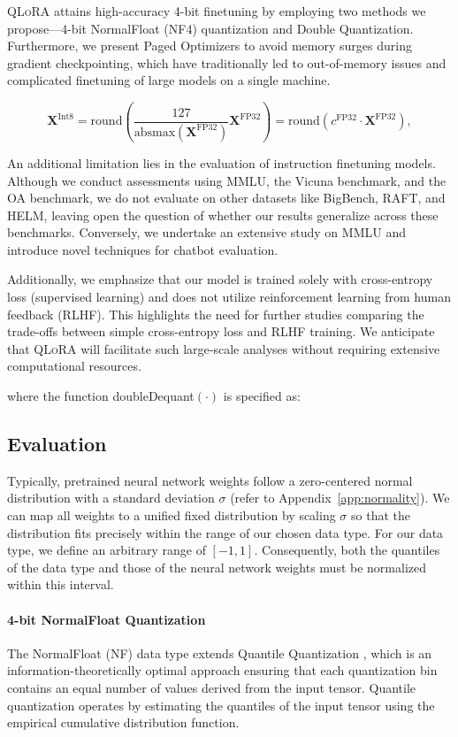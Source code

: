 \textsc{QLoRA} attains high-accuracy 4-bit finetuning by employing two methods we propose—4-bit NormalFloat (NF4) quantization and Double Quantization. Furthermore, we present Paged Optimizers to avoid memory surges during gradient checkpointing, which have traditionally led to out-of-memory issues and complicated finetuning of large models on a single machine.

\begin{equation}
    \mathbf{X}^{ \text{Int8}} = \text{round}\left( \frac{127}{{\text{absmax}}(\mathbf{X}^{{\text{FP32}}})}\mathbf{X}^{{\text{FP32}}} \right) = \text{round}(c^{\text{FP32}}\cdot \mathbf{X}^{{\text{FP32}}}),
\end{equation}

An additional limitation lies in the evaluation of instruction finetuning models. Although we conduct assessments using MMLU, the Vicuna benchmark, and the OA benchmark, we do not evaluate on other datasets like BigBench, RAFT, and HELM, leaving open the question of whether our results generalize across these benchmarks. Conversely, we undertake an extensive study on MMLU and introduce novel techniques for chatbot evaluation.

Additionally, we emphasize that our model is trained solely with cross-entropy loss (supervised learning) and does not utilize reinforcement learning from human feedback (RLHF). This highlights the need for further studies comparing the trade-offs between simple cross-entropy loss and RLHF training. We anticipate that \textsc{QLoRA} will facilitate such large-scale analyses without requiring extensive computational resources.

where the function doubleDequant$(\cdot)$ is specified as:

\subsection{Evaluation}

Typically, pretrained neural network weights follow a zero-centered normal distribution with a standard deviation $\sigma$ (refer to Appendix~\ref{app:normality}). We can map all weights to a unified fixed distribution by scaling $\sigma$ so that the distribution fits precisely within the range of our chosen data type. For our data type, we define an arbitrary range of $[-1, 1]$. Consequently, both the quantiles of the data type and those of the neural network weights must be normalized within this interval.

\paragraph{4-bit NormalFloat Quantization} The NormalFloat (NF) data type extends Quantile Quantization \citep{dettmers2022optimizers}, which is an information-theoretically optimal approach ensuring that each quantization bin contains an equal number of values derived from the input tensor. Quantile quantization operates by estimating the quantiles of the input tensor using the empirical cumulative distribution function.

